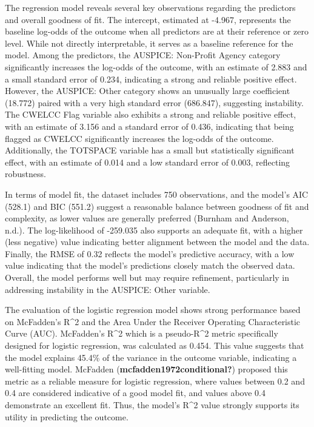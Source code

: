 \documentclass[
  letterpaper,
  DIV=11,
  numbers=noendperiod]{scrartcl}
\begin{document}
The regression model reveals several key observations regarding the
predictors and overall goodness of fit. The intercept, estimated at
-4.967, represents the baseline log-odds of the outcome when all
predictors are at their reference or zero level. While not directly
interpretable, it serves as a baseline reference for the model. Among
the predictors, the AUSPICE: Non-Profit Agency category significantly
increases the log-odds of the outcome, with an estimate of 2.883 and a
small standard error of 0.234, indicating a strong and reliable positive
effect. However, the AUSPICE: Other category shows an unusually large
coefficient (18.772) paired with a very high standard error (686.847),
suggesting instability. The CWELCC Flag variable also exhibits a strong
and reliable positive effect, with an estimate of 3.156 and a standard
error of 0.436, indicating that being flagged as CWELCC significantly
increases the log-odds of the outcome. Additionally, the TOTSPACE
variable has a small but statistically significant effect, with an
estimate of 0.014 and a low standard error of 0.003, reflecting
robustness.

In terms of model fit, the dataset includes 750 observations, and the
model's AIC (528.1) and BIC (551.2) suggest a reasonable balance between
goodness of fit and complexity, as lower values are generally preferred
(Burnham and Anderson, n.d.). The log-likelihood of -259.035 also
supports an adequate fit, with a higher (less negative) value indicating
better alignment between the model and the data. Finally, the RMSE of
0.32 reflects the model's predictive accuracy, with a low value
indicating that the model's predictions closely match the observed data.
Overall, the model performs well but may require refinement,
particularly in addressing instability in the AUSPICE: Other variable.

The evaluation of the logistic regression model shows strong performance
based on McFadden's R\^{}2 and the Area Under the Receiver Operating
Characteristic Curve (AUC). McFadden's R\^{}2 which is a pseudo-R\^{}2
metric specifically designed for logistic regression, was calculated as
0.454. This value suggests that the model explains 45.4\% of the
variance in the outcome variable, indicating a well-fitting model.
McFadden (\textbf{mcfadden1972conditional?}) proposed this metric as a
reliable measure for logistic regression, where values between 0.2 and
0.4 are considered indicative of a good model fit, and values above 0.4
demonstrate an excellent fit. Thus, the model's R\^{}2 value strongly
supports its utility in predicting the outcome.
\end{document}

